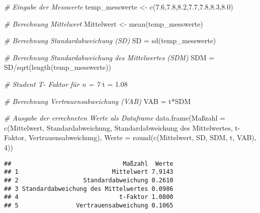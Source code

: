 \documentclass[
]{article}
\newenvironment{Shaded}{\begin{snugshade}}{\end{snugshade}}
\newcommand{\AttributeTok}[1]{\textcolor[rgb]{0.77,0.63,0.00}{#1}}
\newcommand{\CommentTok}[1]{\textcolor[rgb]{0.56,0.35,0.01}{\textit{#1}}}
\newcommand{\DecValTok}[1]{\textcolor[rgb]{0.00,0.00,0.81}{#1}}
\newcommand{\FloatTok}[1]{\textcolor[rgb]{0.00,0.00,0.81}{#1}}
\newcommand{\FunctionTok}[1]{\textcolor[rgb]{0.00,0.00,0.00}{#1}}
\newcommand{\NormalTok}[1]{#1}
\newcommand{\OtherTok}[1]{\textcolor[rgb]{0.56,0.35,0.01}{#1}}
\newcommand{\SpecialCharTok}[1]{\textcolor[rgb]{0.00,0.00,0.00}{#1}}
\newcommand{\StringTok}[1]{\textcolor[rgb]{0.31,0.60,0.02}{#1}}
\begin{document}
\begin{Shaded}
\begin{Highlighting}[]
\CommentTok{\# Eingabe der Messwerte}
\NormalTok{temp\_messwerte }\OtherTok{\textless{}{-}} \FunctionTok{c}\NormalTok{(}\FloatTok{7.6}\NormalTok{,}\FloatTok{7.8}\NormalTok{,}\FloatTok{8.2}\NormalTok{,}\FloatTok{7.7}\NormalTok{,}\FloatTok{7.8}\NormalTok{,}\FloatTok{8.3}\NormalTok{,}\FloatTok{8.0}\NormalTok{)}

\CommentTok{\# Berechnung Mittelwert}
\NormalTok{Mittelwert }\OtherTok{\textless{}{-}} \FunctionTok{mean}\NormalTok{(temp\_messwerte)}

\CommentTok{\# Berechnung Standardabweichung (SD)}
\NormalTok{SD }\OtherTok{=} \FunctionTok{sd}\NormalTok{(temp\_messwerte)}

\CommentTok{\# Berechnung Standardabweichung des Mittelwertes (SDM)}
\NormalTok{SDM }\OtherTok{=}\NormalTok{ SD}\SpecialCharTok{/}\FunctionTok{sqrt}\NormalTok{(}\FunctionTok{length}\NormalTok{(temp\_messwerte))}

\CommentTok{\# Student T{-} Faktor für n = 7}
\NormalTok{t }\OtherTok{=} \FloatTok{1.08}

\CommentTok{\# Berechnung Vertrauensabweichung (VAB)}
\NormalTok{VAB }\OtherTok{=}\NormalTok{ t}\SpecialCharTok{*}\NormalTok{SDM}

\CommentTok{\# Ausgabe der errechneten Werte als Dataframe}
\FunctionTok{data.frame}\NormalTok{(Maßzahl }\OtherTok{=} \FunctionTok{c}\NormalTok{(}\StringTok{\textquotesingle{}Mittelwert\textquotesingle{}}\NormalTok{, }\StringTok{\textquotesingle{}Standardabweichung\textquotesingle{}}\NormalTok{,}
                       \StringTok{\textquotesingle{}Standardabweichung des Mittelwertes\textquotesingle{}}\NormalTok{,}
                       \StringTok{\textquotesingle{}t{-}Faktor\textquotesingle{}}\NormalTok{, }\StringTok{\textquotesingle{}Vertrauensabweichung\textquotesingle{}}\NormalTok{),}
           \AttributeTok{Werte =} \FunctionTok{round}\NormalTok{(}\FunctionTok{c}\NormalTok{(Mittelwert, SD, SDM, t, VAB), }\DecValTok{4}\NormalTok{))}
\end{Highlighting}
\end{Shaded}

\begin{verbatim}
##                               Maßzahl  Werte
## 1                          Mittelwert 7.9143
## 2                  Standardabweichung 0.2610
## 3 Standardabweichung des Mittelwertes 0.0986
## 4                            t-Faktor 1.0800
## 5                Vertrauensabweichung 0.1065
\end{verbatim}
\end{document}
